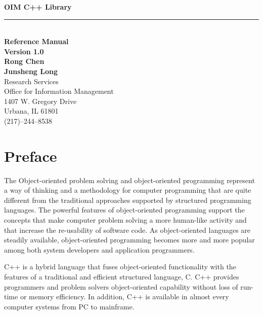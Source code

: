 

\date{November 25, 1990}

\begin{titlepage}
    \vspace*{1.0in}
    \begin{flushright}
          {\huge\bf OIM C++ Library} \\[.25cm]
          {\rule[.1in]{4.5in}{.02in}}\\[.25cm]
          {\large\bf Reference Manual} \\[2.0cm]
          {\large\bf Version 1.0} \\[4.0cm]
          {\bf Rong Chen}\\
          {\bf Junsheng Long}\\[1.0cm]
          {Research Services}\\
          {Office for Information Management}\\
          {1407 W. Gregory Drive}\\
          {Urbana, IL 61801}\\
          {(217)--244--8538}\\
    \end{flushright}
\end{titlepage}

\tableofcontents

\chapter*{Preface}

The Object-oriented problem solving and object-oriented programming 
represent a way of thinking and a methodology for computer
programming that are quite different from the traditional approaches 
supported by structured programming languages. The powerful 
features of object-oriented programming support the concepts that 
make computer problem solving a more human-like activity and 
that increase the re-usability of software code. As object-oriented
languages are steadily available, object-oriented programming
becomes more and more popular among both system developers 
and application programmers.

C++ is a hybrid language that fuses object-oriented functionality
with the features of a traditional and efficient structured language, C. 
C++ provides programmers and problem solvers object-oriented capability
without loss of run-time or memory efficiency. In addition,
C++ is available in almost every computer systems from PC to mainframe.

